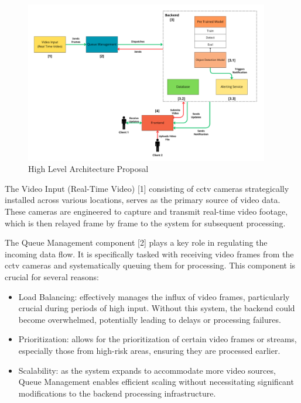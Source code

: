 \begin{figure}[ht]
    \centering 
    \includegraphics[width=0.95\textwidth]{figs/architecture2.png} 
    \caption{High Level Architecture Proposal}
    \label{fig:architecture-proposal}
\end{figure}

The Video Input (Real-Time Video) [1] consisting of \ac{cctv} cameras strategically installed across various locations, serves as the primary source of video data. These cameras are engineered to capture and transmit real-time video footage, which is then relayed frame by frame to the system for subsequent processing.

The Queue Management component [2] plays a key role in regulating the incoming data flow. It is specifically tasked with receiving video frames from the \ac{cctv} cameras and systematically queuing them for processing. This component is crucial for several reasons:
\begin{itemize}
    \item Load Balancing: effectively manages the influx of video frames, particularly crucial during periods of high input. Without this system, the backend could become overwhelmed, potentially leading to delays or processing failures.
    \item Prioritization: allows for the prioritization of certain video frames or streams, especially those from high-risk areas, ensuring they are processed earlier.
    \item Scalability: as the system expands to accommodate more video sources, Queue Management enables efficient scaling without necessitating significant modifications to the backend processing infrastructure.
\end{itemize}

